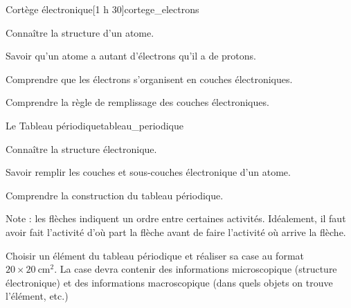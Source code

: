 \begin{multicols}{2}    
  \begin{activite}{Cortège électronique}[1 h 30]{cortege_electrons}
    \begin{prerequis}
      \item Connaître la structure d'un atome.
      \item Savoir qu'un atome a autant d'électrons qu'il a de protons.
    \end{prerequis}
    \begin{objectifs}
      \item Comprendre que les électrons s'organisent en couches électroniques.
      \item Comprendre la règle de remplissage des couches électroniques.
    \end{objectifs}
  \end{activite}

  \begin{TP}{Le Tableau périodique}{tableau_periodique}
    \begin{prerequis}
      \item Connaître la structure électronique.
      \item Savoir remplir les couches et sous-couches électronique d'un atome.
    \end{prerequis}
    \begin{objectifs}
      \item Comprendre la construction du tableau périodique.
    \end{objectifs}
  \end{TP}
\end{multicols}

\vspace*{-2cm}

\vspace*{1.5cm}
Note : les flèches indiquent un ordre entre certaines activités.
Idéalement, il faut avoir fait l'activité d'où part la flèche avant de faire l'activité où arrive la flèche.


\newpage
\nomPrenomClasse
\begin{tacheFinale}
  Choisir un élément du tableau périodique et réaliser sa case au format $20\times\qty{20}{\cm\squared}$.
  La case devra contenir des informations microscopique (structure électronique) et des informations macroscopique (dans quels objets on trouve l'élément, etc.)
\end{tacheFinale}


